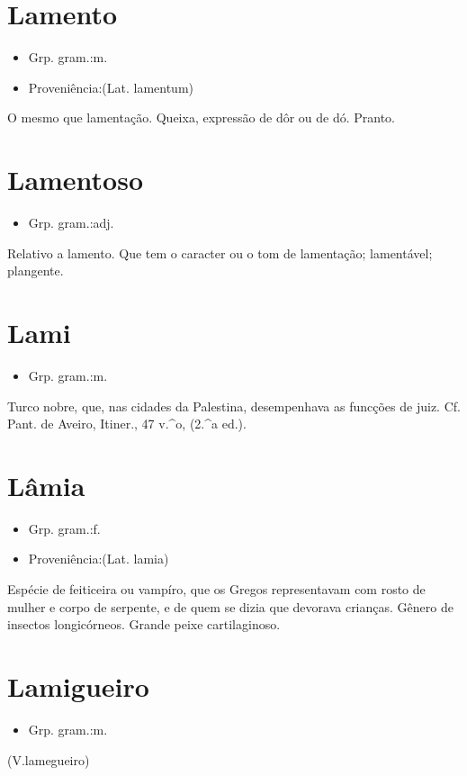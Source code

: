 \section{Lamento}
\begin{itemize}
\item {Grp. gram.:m.}
\end{itemize}
\begin{itemize}
\item {Proveniência:(Lat. \textunderscore lamentum\textunderscore )}
\end{itemize}
O mesmo que \textunderscore lamentação\textunderscore .
Queixa, expressão de dôr ou de dó.
Pranto.
\section{Lamentoso}
\begin{itemize}
\item {Grp. gram.:adj.}
\end{itemize}
Relativo a lamento.
Que tem o caracter ou o tom de lamentação; lamentável; plangente.
\section{Lami}
\begin{itemize}
\item {Grp. gram.:m.}
\end{itemize}
Turco nobre, que, nas cidades da Palestina, desempenhava as funcções de juiz. Cf. Pant. de Aveiro, \textunderscore Itiner.\textunderscore , 47 v.^o, (2.^a ed.).
\section{Lâmia}
\begin{itemize}
\item {Grp. gram.:f.}
\end{itemize}
\begin{itemize}
\item {Proveniência:(Lat. \textunderscore lamia\textunderscore )}
\end{itemize}
Espécie de feiticeira ou vampíro, que os Gregos representavam com rosto de mulher e corpo de serpente, e de quem se dizia que devorava crianças.
Gênero de insectos longicórneos.
Grande peixe cartilaginoso.
\section{Lamigueiro}
\begin{itemize}
\item {Grp. gram.:m.}
\end{itemize}
(V.lamegueiro)
